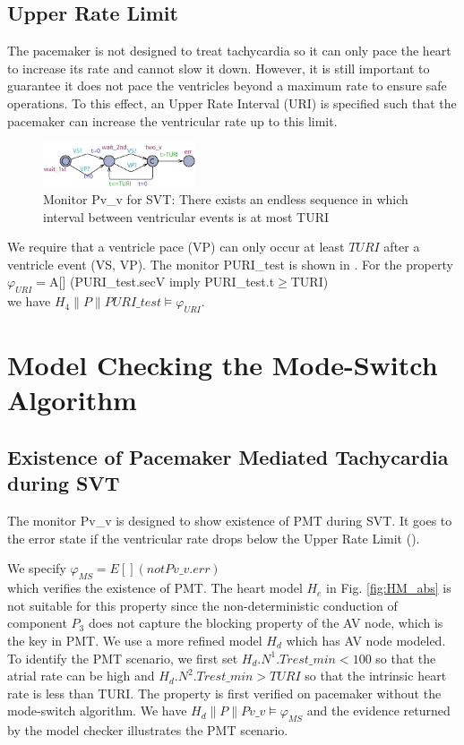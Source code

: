 \subsection{Upper Rate Limit}
\vspace{-10pt}
The pacemaker is not designed to treat tachycardia so it can only pace the heart to increase its rate and cannot slow it down. However, it is still important to guarantee it does not pace the ventricles beyond a maximum rate to ensure safe operations. To this effect, an Upper Rate Interval (URI) is specified such that the pacemaker can increase the ventricular rate up to this limit. 

\begin{figure}[b]
		\centering
		\includegraphics[width=0.4\textwidth]{figs/vv.pdf}
		\caption{\small Monitor \textsf{Pv\_v} for SVT: There exists an endless sequence in which interval between ventricular events is at most TURI}
		\label{fig:vv}
\end{figure}
  
We require that a ventricle pace (VP) can only occur at least $TURI$ after a ventricle event (VS, VP). The monitor \textsf{PURI\_test} is shown in . For the property\\
$\varphi_{URI}=$\textsf{A[] (PURI\_test.secV imply PURI\_test.t$\geq$TURI)} \\
we have $H_4\| P\| PURI\_test\models \varphi_{URI}$.

\section{Model Checking the Mode-Switch Algorithm}

\subsection{Existence of Pacemaker Mediated Tachycardia during SVT}
The monitor \textsf{Pv\_v} is designed to show existence of PMT during SVT. It goes to the error state if the ventricular rate drops below the Upper Rate Limit ().  


We specify 
$\varphi_{MS}=E[] (not Pv\_v.err)$\\
which verifies the existence of PMT. The heart model $H_e$ in Fig. \ref{fig:HM_abs} is not suitable for this property since the non-deterministic conduction of component $P_3$ does not capture the blocking property of the AV node, which is the key in PMT. We use a more refined model $H_d$ which has AV node modeled. To identify the PMT scenario, we first set $H_d.N^1.Trest\_min<100$ so that the atrial rate can be high and $H_d.N^2.Trest\_min>TURI$ so that the intrinsic heart rate is less than TURI. The property is first verified on pacemaker without the mode-switch algorithm. We have $H_d\|P\|Pv\_v\models\varphi_{MS}$ and the evidence returned by the model checker illustrates the PMT scenario.

